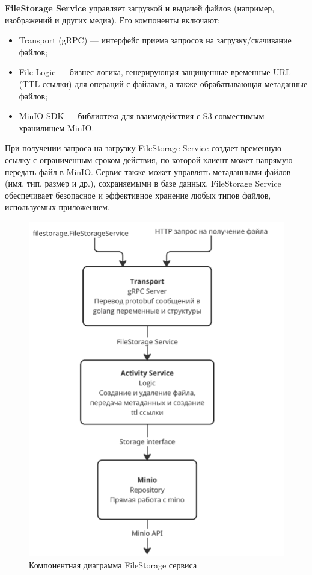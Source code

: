 \textbf{FileStorage Service} управляет загрузкой и выдачей файлов (например, изображений и других медиа). Его компоненты включают:
\begin{itemize}
    \item Transport (gRPC) — интерфейс приема запросов на загрузку/скачивание файлов;
    \item File Logic — бизнес-логика, генерирующая защищенные временные URL (TTL-ссылки) для операций с файлами, а также обрабатывающая метаданные файлов;
    \item MinIO SDK — библиотека для взаимодействия с S3-совместимым хранилищем MinIO.
\end{itemize}
\noindent При получении запроса на загрузку FileStorage Service создает временную ссылку с ограниченным сроком действия, по которой клиент может напрямую передать файл в MinIO. Сервис также может управлять метаданными файлов (имя, тип, размер и др.), сохраняемыми в базе данных. FileStorage Service обеспечивает безопасное и эффективное хранение любых типов файлов, используемых приложением.
\begin{figure}[H]
        \centering
        \includegraphics[width=0.8\linewidth]{Images/second_chapter_backend_architecture/Picture8.png}
        \caption{Компонентная диаграмма FileStorage сервиса}
        \label{fig:filestorage-service-component-diagram}
\end{figure}

